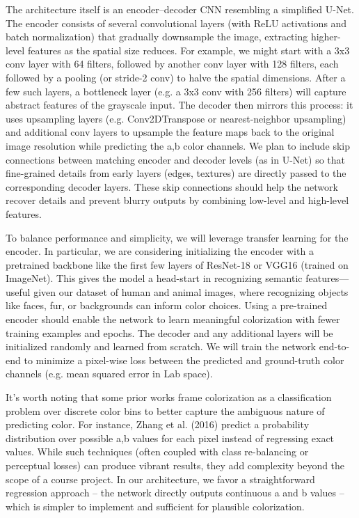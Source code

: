 \documentclass{article} %
\begin{document}
The architecture itself is an encoder–decoder CNN resembling a simplified U-Net. The encoder consists of several convolutional layers (with ReLU activations and batch normalization) that gradually downsample the image, extracting higher-level features as the spatial size reduces. For example, we might start with a 3x3 conv layer with 64 filters, followed by another conv layer with 128 filters, each followed by a pooling (or stride-2 conv) to halve the spatial dimensions. After a few such layers, a bottleneck layer (e.g. a 3x3 conv with 256 filters) will capture abstract features of the grayscale input. The decoder then mirrors this process: it uses upsampling layers (e.g. Conv2DTranspose or nearest-neighbor upsampling) and additional conv layers to upsample the feature maps back to the original image resolution while predicting the a,b color channels. We plan to include skip connections between matching encoder and decoder levels (as in U-Net) so that fine-grained details from early layers (edges, textures) are directly passed to the corresponding decoder layers. These skip connections should help the network recover details and prevent blurry outputs by combining low-level and high-level features. \cite{leatvanich2025image}

To balance performance and simplicity, we will leverage transfer learning for the encoder. In particular, we are considering initializing the encoder with a pretrained backbone like the first few layers of ResNet-18 or VGG16 (trained on ImageNet). This gives the model a head-start in recognizing semantic features—useful given our dataset of human and animal images, where recognizing objects like faces, fur, or backgrounds can inform color choices. \cite{olah2022lettherebecolor} Using a pre-trained encoder should enable the network to learn meaningful colorization with fewer training examples and epochs. \cite{olah2022lettherebecolor} The decoder and any additional layers will be initialized randomly and learned from scratch. We will train the network end-to-end to minimize a pixel-wise loss between the predicted and ground-truth color channels (e.g. mean squared error in Lab space).

It’s worth noting that some prior works frame colorization as a classification problem over discrete color bins to better capture the ambiguous nature of predicting color. For instance, Zhang et al. (2016) predict a probability distribution over possible a,b values for each pixel instead of regressing exact values. \cite{olah2022lettherebecolor} While such techniques (often coupled with class re-balancing or perceptual losses) can produce vibrant results, they add complexity beyond the scope of a course project. In our architecture, we favor a straightforward regression approach – the network directly outputs continuous a and b values – which is simpler to implement and sufficient for plausible colorization.
\end{document}
